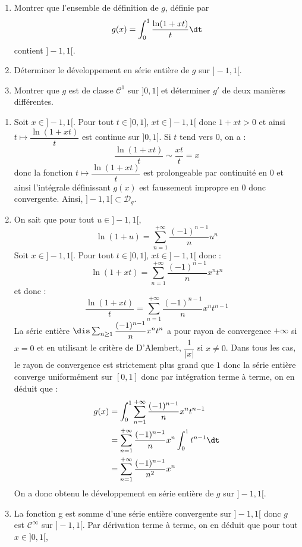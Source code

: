 \documentclass[a4paper,10pt]{report}
\begin{document}
\begin{Exercice}{} \begin{enumerate}
\item Montrer que l'ensemble de définition de $g$, définie par 
$$ g(x) = \int_{0}^1 \dfrac{\ln(1+xt)}{t} \dt$$
contient $]-1,1[$.
\item Déterminer le développement en série entière de $g$ sur $]-1,1[$.
\item Montrer que $g$ est de classe $\mathcal{C}^1$ sur $]0,1[$ et déterminer $g'$ de deux manières différentes.
\end{enumerate}
\end{Exercice}

\corr \begin{enumerate}
\item Soit $x \in ]-1,1[$. Pour tout $t \in ]0,1]$, $xt \in ]-1,1[$ donc $1+xt >0$ et ainsi $t \mapsto \dfrac{\ln(1+xt)}{t} $ est continue sur $]0,1]$. Si $t$ tend vers $0$, on a :
$$ \dfrac{\ln(1+xt)}{t}  \sim \dfrac{xt}{t}= x$$
donc la fonction $t \mapsto \dfrac{\ln(1+xt)}{t} $ est prolongeable par continuité en $0$ et ainsi l'intégrale définissant $g(x)$ est faussement impropre en $0$ donc convergente. Ainsi, $]-1,1[ \subset \mathcal{D}_g$.
\item On sait que pour tout $u \in ]-1,1[$,
$$ \ln(1+u) = \sum_{n=1}^{+ \infty} \dfrac{(-1)^{n-1}}{n} u^n$$
Soit $x \in ]-1,1[$. Pour tout $t \in ]0,1]$, $xt \in ]-1,1[$ donc :
$$ \ln(1+xt) = \sum_{n=1}^{+ \infty} \dfrac{(-1)^{n-1}}{n} x^n t^n$$
et donc :
$$ \dfrac{\ln(1+xt)}{t} = \sum_{n=1}^{+ \infty} \dfrac{(-1)^{n-1}}{n} x^n t^{n-1}$$
La série entière $\dis \sum_{n \geq 1} \dfrac{(-1)^{n-1}}{n} x^n t^n$ a pour rayon de convergence $+ \infty$ si $x=0$ et en utilisant le critère de D'Alembert, $\dfrac{1}{\vert x \vert}$ si $x \neq 0$. Dans tous les cas, le rayon de convergence est strictement plus grand que $1$ donc la série entière converge uniformément sur $[0,1]$ donc par intégration terme à terme, on en déduit que :
\begin{align*}
g(x) & = \int_{0}^1 \sum_{n=1}^{+ \infty} \dfrac{(-1)^{n-1}}{n} x^n t^{n-1} \\
& = \sum_{n=1}^{+ \infty} \dfrac{(-1)^{n-1}}{n} x^n \int_{0}^1 t^{n-1} \dt \\
& = \sum_{n=1}^{+ \infty} \dfrac{(-1)^{n-1}}{n^2} x^n
\end{align*} 
On a donc obtenu le développement en série entière de $g$ sur $]-1,1[$.
\item La fonction g est somme d'une série entière convergente sur $]-1,1[$ donc $g$ est $\mathcal{C}^{\infty}$ sur $]-1,1[$. Par dérivation terme à terme, on en déduit que pour tout $x \in ]0,1[$,

\end{enumerate}
\end{document}
